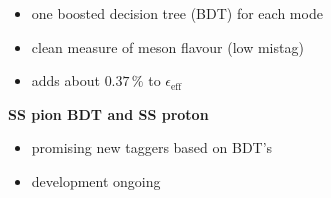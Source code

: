 {\begin{minipage}{0.474\boxwidth}
\begin{itemize}
\item one boosted decision tree (BDT) for each mode
\item clean measure of \B meson flavour (low mistag) 
\item adds about $0.37\,\%$ to $\epsilon_{\text{eff}}$
\end{itemize}
\vspace{0.2em}
\textbf{SS pion BDT and SS proton}
\vspace{-0.1em}
\begin{itemize}
\setlength\itemsep{0.01em}
\item promising new taggers based on BDT's
\item development ongoing
\end{itemize}
\vspace{-0.75em}
\end{minipage}
}




